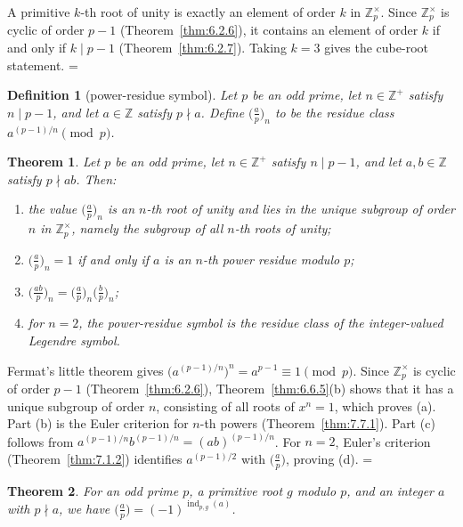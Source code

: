 \documentclass[11pt]{article}
\makeatletter
\theoremstyle{ntstyle}
\newtheorem{theorem}{Theorem}[subsection]
\newtheorem{definition}{Definition}[subsection]
\let\nt@closedisplay\]
\def\nt@guardedclose{\@ifnextchar\par{\nt@closeafterpar}{\@ifnextchar\end{\postdisplaypenalty\@M\nt@closedisplay}{\nt@closedisplay}}}
\def\nt@closeafterpar\par{\@ifnextchar\par{\nt@closeafterpar}{\@ifnextchar\end{\postdisplaypenalty\@M\nt@closedisplay\par}{\nt@closedisplay\par}}}
\renewenvironment{proof}[1][\proofname]{\par
  \pushQED{\qed}\normalfont\topsep\medskipamount\edef\nt@afterproof{\@endparpenalty=\the\@endparpenalty\relax}\@beginparpenalty\@M\@endparpenalty\@M\let\]\nt@guardedclose\trivlist\item[]\textit{#1\@addpunct{.}} \ignorespaces}{\ifvmode\addpenalty\@M\fi\popQED\nt@afterproof\endtrivlist\@endpefalse}
\newcommand{\legs}[2]{\bigl(\tfrac{#1}{#2}\bigr)}
\newcommand{\plegs}[3]{\bigl(\tfrac{#1}{#2}\bigr)_{#3}}
\newcommand{\ZmodUnits}[1]{\mathbb{Z}_{#1}^{\times}}
\DeclareMathOperator{\ind}{ind}
\makeatother
\begin{document}
\begin{proof} A primitive $k$-th root of unity is exactly
	an element of order $k$ in $\ZmodUnits{p}$. Since
	$\ZmodUnits{p}$ is cyclic of order $p-1$ (Theorem~\ref{thm:6.2.6}), it
	contains
	an element of order $k$ if and only if $k \mid p-1$ (Theorem~\ref{thm:6.2.7}). Taking $k
		= 3$ gives the cube-root statement.
\end{proof}
\begin{definition}[power-residue symbol]\label{def:7.7.5} Let $p$
	be an odd prime, let $n\in\mathbb{Z}^+$ satisfy $n\mid p-1$, and let
	$a\in\mathbb{Z}$ satisfy $p\nmid a$. Define $\plegs{a}{p}{n}$
	to be the residue class $a^{(p-1)/n}\pmod{p}$.
\end{definition}
\begin{theorem}\label{thm:7.7.3} Let $p$ be an odd prime, let $n\in\mathbb{Z}^+$
	satisfy $n\mid p-1$, and let $a,b\in\mathbb{Z}$ satisfy $p\nmid ab$.
	Then:
	\begin{enumerate}[label={\alph*)}]
		\item the value $\plegs{a}{p}{n}$ is an $n$-th root of unity and lies
					in the unique subgroup of order $n$ in $\ZmodUnits{p}$, namely
					the subgroup of all $n$-th roots of unity;
		\item $\plegs{a}{p}{n}=1$ if and only if $a$ is an $n$-th power
					residue modulo $p$;
		\item $\plegs{ab}{p}{n}=\plegs{a}{p}{n}\plegs{b}{p}{n}$;
		\item for $n=2$, the power-residue symbol is the residue class of the integer-valued Legendre symbol.
	\end{enumerate}
\end{theorem}

\begin{proof} Fermat's little theorem gives
	$\big(a^{(p-1)/n}\big)^n=a^{p-1}\equiv1\pmod{p}$. Since
	$\ZmodUnits{p}$ is cyclic of order $p-1$ (Theorem~\ref{thm:6.2.6}), Theorem~\ref{thm:6.6.5}(b)
	shows that it has a unique
	subgroup of order $n$, consisting of all roots of $x^n=1$, which proves
	(a). Part (b) is the Euler criterion for $n$-th powers (Theorem~\ref{thm:7.7.1}). Part (c) follows from
	$a^{(p-1)/n}b^{(p-1)/n}=(ab)^{(p-1)/n}$. For $n=2$, Euler's criterion
	(Theorem~\ref{thm:7.1.2}) identifies $a^{(p-1)/2}$ with $\legs{a}{p}$, proving
	(d).
\end{proof}
\begin{theorem}\label{thm:7.7.4} For an odd
	prime $p$, a primitive root $g$ modulo $p$, and an integer $a$ with $p
		\nmid a$, we have $\legs{a}{p} = (-1)^{\ind_{p,g}(a)}$.
\end{theorem}
\end{document}
